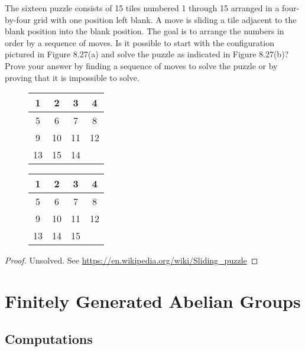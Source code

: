 \newpage
\begin{exercise}
    The sixteen puzzle consists of 15 tiles numbered 1 through 15 arranged in a four-by-four grid with one position left blank. A move is sliding a tile adjacent to the blank position into the blank position. The goal is to arrange the numbers in order by a sequence of moves. Is it possible to start with the configuration pictured in Figure 8.27(a) and solve the puzzle as indicated in Figure 8.27(b)? Prove your answer by finding a sequence of moves to solve the puzzle or by proving that it is impossible to solve.
    \begin{figure}[htp]
        \centering
        \begin{tabular}{|c|c|c|c|}
            \hline
            1  & 2  & 3  & 4  \\
            \hline
            5  & 6  & 7  & 8  \\
            \hline
            9  & 10 & 11 & 12 \\
            \hline
            13 & 15 & 14 &    \\
            \hline
        \end{tabular}
        \hspace{2cm}
        \begin{tabular}{|c|c|c|c|}
            \hline
            1  & 2  & 3  & 4  \\
            \hline
            5  & 6  & 7  & 8  \\
            \hline
            9  & 10 & 11 & 12 \\
            \hline
            13 & 14 & 15 &    \\
            \hline
        \end{tabular}
    \end{figure}
\end{exercise}

\begin{proof}
    Unsolved. See \url{https://en.wikipedia.org/wiki/Sliding_puzzle}
\end{proof}

\newpage
\section{Finitely Generated Abelian Groups}

\subsection*{Computations}

